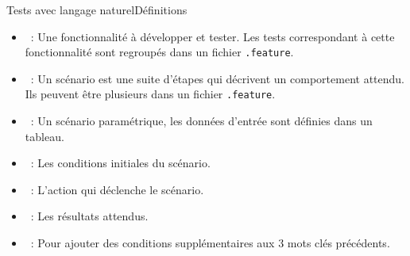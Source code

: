 \documentclass{beamer}
\begin{document}
    \begin{frame}{Tests avec langage naturel}{Définitions}
        \transdissolve
        \begin{itemize}
            \item {}~: Une fonctionnalité à développer et tester.
            Les tests correspondant à cette fonctionnalité sont regroupés dans un fichier \lstinline{.feature}.
            \item {}~: Un scénario est une suite d'étapes qui décrivent un comportement attendu.
            Ils peuvent être plusieurs dans un fichier \lstinline{.feature}.
            \item {}~: Un scénario paramétrique, les données d'entrée sont définies dans un tableau.
            \item {}~: Les conditions initiales du scénario.
            \item {}~: L'action qui déclenche le scénario.
            \item {}~: Les résultats attendus.
            \item {}~: Pour ajouter des conditions supplémentaires aux 3 mots clés précédents.
        \end{itemize}
    \end{frame}
\end{document}
